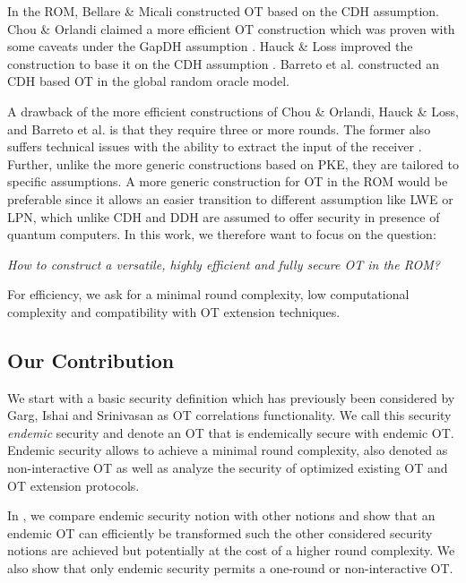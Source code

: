 In the ROM, Bellare \& Micali \cite{C:BelMic89} constructed OT based on the CDH assumption. Chou \& Orlandi \cite{LC:ChoOrl15} claimed a more efficient OT construction which was proven with some caveats under the GapDH assumption \cite{cryptoeprint:2017:1011}. Hauck \& Loss improved the construction to base it on the CDH assumption \cite{cryptoeprint:2017:1011}. Barreto et al. \cite{EPRINT:BDDMN17b} constructed an CDH based OT in the global random oracle model.  

A drawback of the more efficient constructions of Chou \& Orlandi, Hauck \& Loss, and Barreto et al. is that they require three or more rounds. The former also suffers technical issues with the ability to extract the input of the receiver \cite{LC:ChoOrl15, EPRINT:BPRS17}. Further, unlike the more generic constructions based on PKE, they are tailored to specific assumptions. A more generic construction for OT in the ROM would be preferable since it allows an easier transition to different assumption like LWE or LPN, which unlike CDH and DDH are assumed to offer security in presence of quantum computers. In this work, we therefore want to focus on the question:

\begin{center}
\emph{How to construct a versatile, highly efficient and fully secure OT in the ROM?}
\end{center}

For efficiency, we ask for a minimal round complexity, low computational complexity and compatibility with OT extension techniques.

\subsection{Our Contribution}

We start with a basic security definition which has previously been considered by Garg, Ishai and Srinivasan \cite{TCC:GarIshSri18} as OT correlations functionality. We call this security \emph{endemic} security and denote an OT that is endemically secure with endemic OT. Endemic security allows to achieve a minimal round complexity, also denoted as non-interactive OT \cite{C:BelMic89,TCC:GarIshSri18} as well as analyze the security of optimized existing OT and OT extension protocols.

In , we compare endemic security notion with other notions and show that an endemic OT can efficiently  be transformed such the other considered security notions are achieved but potentially at the cost of a higher round complexity. We also show that  only endemic security permits a one-round or non-interactive OT.

